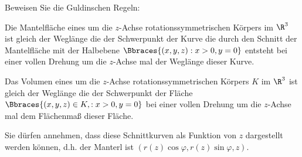 
\begin{exercise}

Beweisen Sie die Guldinschen Regeln:

Die Mantelfläche eines um die $z$-Achse rotationssymmetrischen Körpers im $\R^3$ ist gleich der Weglänge die der Schwerpunkt der Kurve die durch den Schnitt der Mantelfläche mit der Halbebene $\Bbraces{(x, y, z) : x > 0, y = 0}$ entsteht bei einer vollen Drehung um die $z$-Achse mal der Weglänge dieser Kurve.

Das Volumen eines um die $z$-Achse rotationssymmetrischen Körpers $K$ im $\R^3$ ist gleich der Weglänge die der Schwerpunkt der Fläche $\Bbraces{(x, y, z) \in K,: x > 0, y = 0}$ bei einer vollen Drehung um die $z$-Achse mal dem Flächenmaß dieser Fläche.

Sie dürfen annehmen, dass diese Schnittkurven als Funktion von $z$ dargestellt werden können, d.h. der Manterl ist $(r(z) \cos \varphi, r(z) \sin \varphi, z)$.

\end{exercise}


